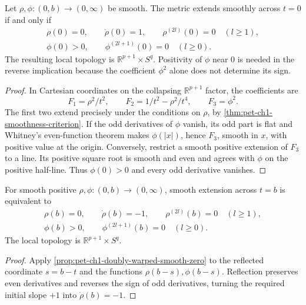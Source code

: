 \begin{proposition}[Smoothness at $t=0$]
  \label{prop:pet-ch1-doubly-warped-smooth-zero}


  Let $\rho,\phi:(0,b)\to(0,\infty)$ be smooth. The metric extends smoothly
  across $t=0$ if and only if
  \[
  \begin{gathered}
    \rho(0)=0,\qquad \dot\rho(0)=1,
    \qquad \rho^{(2l)}(0)=0\quad(l\ge1),\\
    \phi(0)>0,
    \qquad \phi^{(2l+1)}(0)=0\quad(l\ge0).
  \end{gathered}
  \]
  The resulting local topology is $\mathbb{R}^{p+1}\times S^q$. Positivity of
  $\phi$ near $0$ is needed in the reverse implication because the coefficient
  $\phi^2$ alone does not determine its sign.
\end{proposition}
\begin{proof}

  \sketch
  In Cartesian coordinates on the collapsing $\mathbb{R}^{p+1}$ factor, the
  coefficients are
  \[
    F_1=\rho^2/t^2,\qquad F_2=1/t^2-\rho^2/t^4,
    \qquad F_3=\phi^2.
  \]
  The first two extend precisely under the conditions on $\rho$, by
  \cref{thm:pet-ch1-smoothness-criterion}. If the odd derivatives of $\phi$
  vanish, its odd part is flat and Whitney's even-function theorem makes
  $\phi(|x|)$, hence $F_3$, smooth in $x$, with positive value at the origin.
  Conversely, restrict a smooth positive extension of $F_3$ to a line.
  Its positive square root is smooth and even and agrees with $\phi$ on the
  positive half-line. Thus $\phi(0)>0$ and every odd derivative vanishes.
\end{proof}

\begin{proposition}[Smoothness at $t=b$]
  \label{prop:pet-ch1-doubly-warped-smooth-b}


  For smooth positive $\rho,\phi:(0,b)\to(0,\infty)$, smooth extension across
  $t=b$ is equivalent to
  \[
  \begin{gathered}
    \rho(b)=0,\qquad \dot\rho(b)=-1,
    \qquad \rho^{(2l)}(b)=0\quad(l\ge1),\\
    \phi(b)>0,
    \qquad \phi^{(2l+1)}(b)=0\quad(l\ge0).
  \end{gathered}
  \]
  The local topology is $\mathbb{R}^{p+1}\times S^q$.
\end{proposition}
\begin{proof}

  \sketch
  Apply \cref{prop:pet-ch1-doubly-warped-smooth-zero} to the reflected
  coordinate $s=b-t$ and the functions $\rho(b-s),\phi(b-s)$. Reflection
  preserves even derivatives and reverses the sign of odd derivatives, turning
  the required initial slope $+1$ into $\dot\rho(b)=-1$.
\end{proof}

